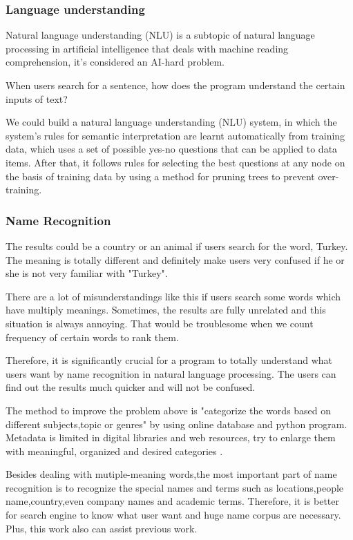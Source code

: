 \subsubsection*{Language understanding}
Natural language understanding (NLU) is a subtopic of natural language processing in artificial intelligence that deals with machine reading comprehension, it's considered an AI-hard problem.

When users search for a sentence, how does the program understand the certain inputs of text? 

We could build a natural language understanding (NLU) system, in which the system's rules for semantic interpretation are 
learnt automatically from training data, which uses a set of possible yes-no questions that can be applied to data items.
After that, it follows rules for selecting the best questions at any node on the basis of training data by using a method for pruning trees to prevent over-training.

\subsubsection*{Name Recognition}

The results could be a country or an animal if users search for the word, Turkey. The meaning is totally different and
definitely make users very confused if he or she is not very familiar with "Turkey". 

There are a lot of misunderstandings like this if users search some words which have multiply meanings.
Sometimes, the results are fully unrelated and this situation is always annoying. 
That would be troublesome when we count frequency of certain words to rank them.

Therefore, it is significantly crucial for a program to totally understand what users want by name recognition in natural language processing. 
The users can find out the results much quicker and will not be confused.

The method to improve the problem above is "categorize the words based on different subjects,topic or genres" by using online database and python program.
Metadata is limited in digital libraries and web resources, try to enlarge them with meaningful, organized and desired
categories \cite{Kules2006}.

Besides dealing with mutiple-meaning words,the most important part of name recognition is to recognize the special names and terms such as locations,people name,country,even company names and academic terms.
Therefore, it is better for search engine to know what user want and huge name corpus are necessary. Plus, this work also can assist previous work.

